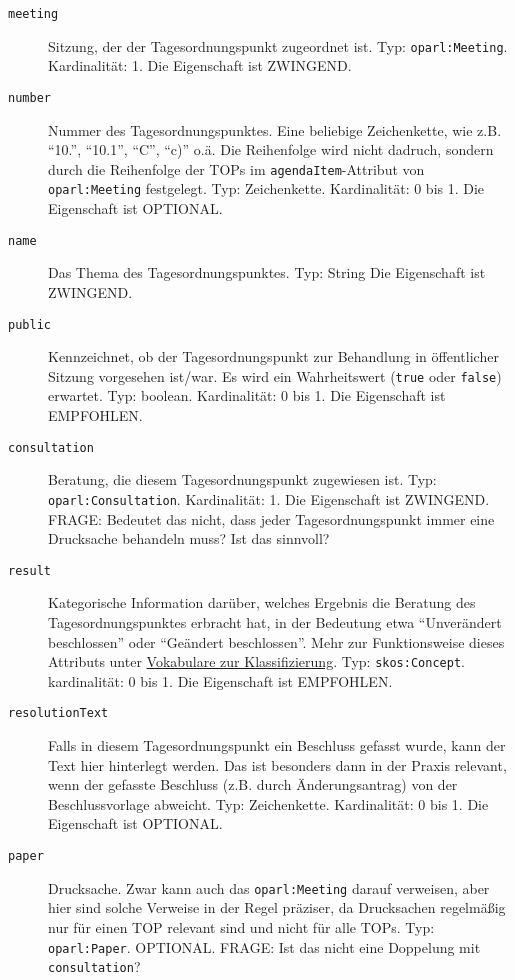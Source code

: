 \documentclass[,a4paper]{article}
\begin{document}
\begin{description}
\item[\texttt{meeting}]
Sitzung, der der Tagesordnungspunkt zugeordnet ist. Typ:
\texttt{oparl:Meeting}. Kardinalität: 1. Die Eigenschaft ist ZWINGEND.
\item[\texttt{number}]
Nummer des Tagesordnungspunktes. Eine beliebige Zeichenkette, wie z.B.
``10.'', ``10.1'', ``C'', ``c)'' o.ä. Die Reihenfolge wird nicht
dadruch, sondern durch die Reihenfolge der TOPs im
\texttt{agendaItem}-Attribut von \texttt{oparl:Meeting} festgelegt. Typ:
Zeichenkette. Kardinalität: 0 bis 1. Die Eigenschaft ist OPTIONAL.
\item[\texttt{name}]
Das Thema des Tagesordnungspunktes. Typ: String Die Eigenschaft ist
ZWINGEND.
\item[\texttt{public}]
Kennzeichnet, ob der Tagesordnungspunkt zur Behandlung in öffentlicher
Sitzung vorgesehen ist/war. Es wird ein Wahrheitswert (\texttt{true}
oder \texttt{false}) erwartet. Typ: boolean. Kardinalität: 0 bis 1. Die
Eigenschaft ist EMPFOHLEN.
\item[\texttt{consultation}]
Beratung, die diesem Tagesordnungspunkt zugewiesen ist. Typ:
\texttt{oparl:Consultation}. Kardinalität: 1. Die Eigenschaft ist
ZWINGEND. FRAGE: Bedeutet das nicht, dass jeder Tagesordnungspunkt immer
eine Drucksache behandeln muss? Ist das sinnvoll?
\item[\texttt{result}]
Kategorische Information darüber, welches Ergebnis die Beratung des
Tagesordnungspunktes erbracht hat, in der Bedeutung etwa ``Unverändert
beschlossen'' oder ``Geändert beschlossen''. Mehr zur Funktionsweise
dieses Attributs unter
\hyperref[vokabulareux5fklassifizierung]{Vokabulare zur
Klassifizierung}. Typ: \texttt{skos:Concept}. kardinalität: 0 bis 1. Die
Eigenschaft ist EMPFOHLEN.
\item[\texttt{resolutionText}]
Falls in diesem Tagesordnungspunkt ein Beschluss gefasst wurde, kann der
Text hier hinterlegt werden. Das ist besonders dann in der Praxis
relevant, wenn der gefasste Beschluss (z.B. durch Änderungsantrag) von
der Beschlussvorlage abweicht. Typ: Zeichenkette. Kardinalität: 0 bis 1.
Die Eigenschaft ist OPTIONAL.
\item[\texttt{paper}]
Drucksache. Zwar kann auch das \texttt{oparl:Meeting} darauf verweisen,
aber hier sind solche Verweise in der Regel präziser, da Drucksachen
regelmäßig nur für einen TOP relevant sind und nicht für alle TOPs. Typ:
\texttt{oparl:Paper}. OPTIONAL. FRAGE: Ist das nicht eine Doppelung mit
\texttt{consultation}?

\end{description}
\end{document}
